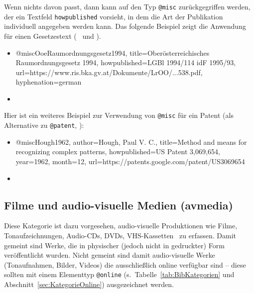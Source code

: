 Wenn nichts davon passt, dann kann auf den Typ \texttt{@misc} zurückgegriffen werden, der ein
Textfeld \texttt{howpublished} vorsieht, in dem die Art der Publikation individuell 
angegeben werden kann. Das folgende Beispiel zeigt die Anwendung für einen Gesetzestext 
(\sa\ \cite{FhStG1993} und \cite{EuRichtlinie2000}).
%
\begin{itemize}
\item[]
\begin{GenericCode}[numbers=none]
@misc{OoeRaumordnungsgesetz1994,
  title={Oberösterreichisches Raumordnungsgesetz 1994},
  howpublished={LGBl 1994/114 idF 1995/93},
  url={https://www.ris.bka.gv.at/Dokumente/LrOO/...538.pdf},
  hyphenation={german}
}
\end{GenericCode}
\item[\cite{OoeRaumordnungsgesetz1994}] 
\end{itemize}
%
Hier ist ein weiteres Beispiel zur Verwendung von \texttt{@misc} für ein Patent (als Alternative zu \texttt{@patent}, \so):
%
\begin{itemize}
\item[]
\begin{GenericCode}[numbers=none]
@misc{Hough1962,
	author={Hough, Paul V. C.},
	title={Method and means for recognizing complex patterns},
	howpublished={US Patent 3,069,654},
	year={1962},
	month={12},
	url={https://patents.google.com/patent/US3069654}
}
\end{GenericCode}
\item[\cite{Hough1962}] 
\end{itemize}





\subsection{Filme und audio-visuelle Medien (\textsf{avmedia})}
\label{sec:KategorieAvmedia}
Diese Kategorie ist dazu vorgesehen, audio-visuelle Produktionen wie Filme, 
Tonaufzeichnungen, Audio-CDs, DVDs, VHS-Kassetten \usw\ zu erfassen.
Damit gemeint sind Werke, die in physischer (jedoch nicht in gedruckter) Form
veröffentlicht wurden.
Nicht gemeint sind damit audio-visuelle Werke (Tonaufnahmen, Bilder, Videos) 
die ausschließlich online verfügbar sind -- diese sollten mit einem Elementtyp 
\texttt{@online} (s.\ Tabelle~\ref{tab:BibKategorien} und Abschnitt~\ref{sec:KategorieOnline}) ausgezeichnet werden.

